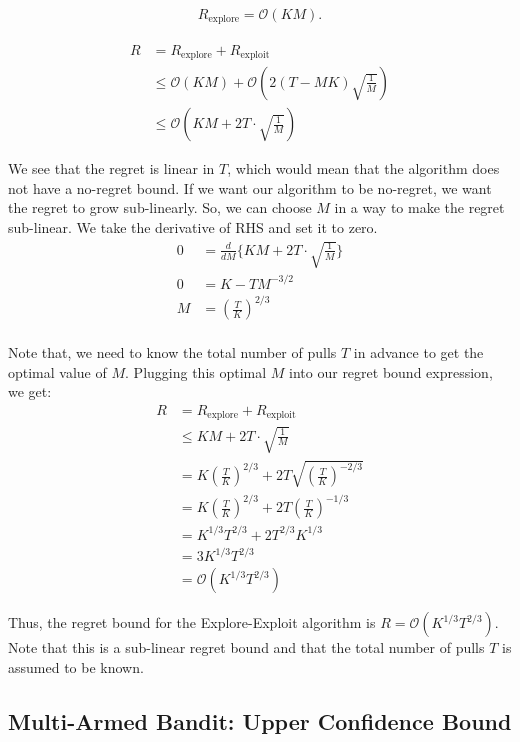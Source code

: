 \documentclass[11pt]{article}
\begin{document}
\begin{align*}
R_{\text{explore}} = \mathcal{O}(KM).
\end{align*}

\begin{align*}
    R &= R_{\text{explore}} + R_{\text{exploit}} \\
    &\leq \mathcal{O}(KM) +  \mathcal{O}\left(2(T-MK) \sqrt{\frac{1}{M}}\right)\\
    &\leq \mathcal{O}\left(KM + 2T \cdot \sqrt{\frac{1}{M}}\right)
\end{align*}

We see that the regret is linear in $T$, which would mean that the algorithm does not have a no-regret bound. If we want our
algorithm to be no-regret, we want the regret to grow sub-linearly. So, we can choose
$M$ in a way to make the regret sub-linear. We take the derivative of RHS and set it to zero.
\begin{align*}
    0 &= \frac{d}{dM} \Big\{ KM + 2T \cdot \sqrt{\frac{1}{M}} \Big\}\\
    0 &= K - TM^{-3/2}\\
    M &= \left( \frac{T}{K} \right)^{2/3}\\
\end{align*}

Note that, we need to know the total number of pulls $T$ in advance to get the optimal value of $M$. Plugging this optimal $M$ into our regret bound expression, we get:
\begin{align*}
    R &= R_{\text{explore}} + R_{\text{exploit}}\\
    &\leq KM + 2T \cdot \sqrt{\frac{1}{M}}\\ 
    &= K \left( \frac{T}{K} \right)^{2/3} + 2T \sqrt{\left( \frac{T}{K}\right)^{-2/3}}\\
    &= K \left( \frac{T}{K} \right)^{2/3} + 2T \left( \frac{T}{K}\right)^{-1/3}\\
    &= K^{1/3}T^{2/3} + 2T^{2/3}K^{1/3}\\
    &= 3K^{1/3}T^{2/3}\\
    &= \mathcal{O}(K^{1/3}T^{2/3})
\end{align*}

Thus, the regret bound for the Explore-Exploit algorithm is $R = \mathcal{O}(K^{1/3}T^{2/3})$. Note that this
is a sub-linear regret bound and that the total number of pulls $T$ is assumed to be known.

\subsection{Multi-Armed Bandit: Upper Confidence Bound}
\end{document}
